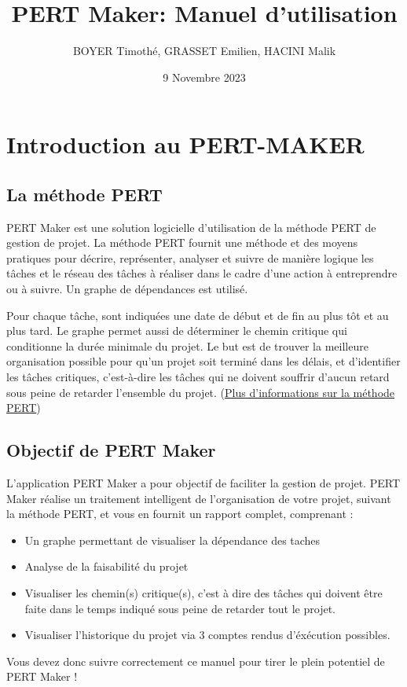 \documentclass{article}
\title{\centering PERT Maker: Manuel d'utilisation}
\author{BOYER Timothé, GRASSET Emilien, HACINI Malik}
\date{9 Novembre 2023}
\begin{document}
    
    
\maketitle
\tableofcontents{}
\newpage

\section{Introduction au PERT-MAKER}
\subsection{La méthode PERT}
PERT Maker est une solution logicielle d'utilisation de la méthode PERT de gestion de projet.
La méthode PERT fournit une méthode et des moyens pratiques pour décrire,
représenter, analyser et suivre de manière logique les tâches et le réseau des tâches à réaliser dans le cadre d'une 
action à entreprendre ou à suivre.
Un graphe de dépendances est utilisé. 

Pour chaque tâche, sont indiquées une date de début et de fin au plus tôt et au plus tard. 
Le graphe permet aussi de déterminer le chemin critique qui conditionne la durée minimale du projet.
Le but est de trouver la meilleure organisation possible pour qu'un projet soit terminé dans les délais, et d'identifier les tâches critiques, 
c'est-à-dire les tâches qui ne doivent souffrir d'aucun retard sous peine de retarder l'ensemble du projet.
(\textcolor{blue}{\href{https://fr.wikipedia.org/wiki/PERT}{Plus d'informations sur la méthode PERT}})


\subsection{Objectif de PERT Maker}

L'application PERT Maker a pour objectif de faciliter la gestion de projet. PERT Maker réalise un traitement intelligent de l'organisation de votre projet, suivant 
la méthode PERT, et vous en fournit un rapport complet, comprenant :
\begin{itemize}
    \item Un graphe permettant de visualiser la dépendance des taches
    \item Analyse de la faisabilité du projet
    \item Visualiser les chemin(s) critique(s), c'est à dire des tâches qui doivent être faite dans le temps indiqué sous peine de retarder tout le projet.
    \item Visualiser l'historique du projet via 3 comptes rendus d'éxécution possibles.
\end{itemize} 
Vous devez donc suivre correctement ce manuel pour tirer le plein potentiel de PERT Maker !
\end{document}
